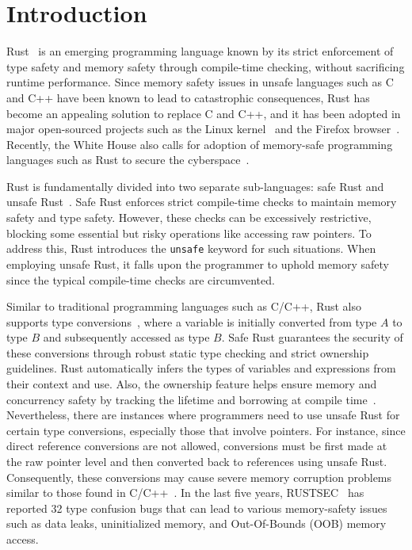\section{Introduction}

Rust~\cite{RustLang} is an emerging programming language known by its strict enforcement of type safety and memory safety through compile-time checking, without sacrificing runtime performance. Since memory safety issues in unsafe languages such as C and C++ have been known to lead to catastrophic consequences, Rust has become an appealing solution to replace C and C++, and it has been adopted in major open-sourced projects such as the Linux kernel~\cite{LinuxKernel} and the Firefox browser~\cite{MozillaFirefox}. Recently, the White House also calls for adoption of memory-safe programming languages such as Rust to secure the cyberspace~\cite{whitehouse}.

Rust is fundamentally divided into two separate sub-languages: safe Rust and unsafe Rust~\cite{safeunsafe}. Safe Rust enforces strict compile-time checks to maintain memory safety and type safety. However, these checks can be excessively restrictive, blocking some essential but risky operations like accessing raw pointers. To address this, Rust introduces the {\tt unsafe} keyword for such situations. When employing unsafe Rust, it falls upon the programmer to uphold memory safety since the typical compile-time checks are circumvented.

Similar to traditional programming languages such as C/C++, Rust also supports type conversions~\cite{TypeConv22online}, where a variable is initially converted from type $A$ to type $B$  and subsequently accessed as type $B$. Safe Rust guarantees the security of these conversions through robust static type checking and strict ownership guidelines. Rust automatically infers the types of variables and expressions from their context and use. Also, the ownership feature helps ensure memory and concurrency safety by tracking the lifetime and borrowing at compile time~\cite{Ownership}. Nevertheless, there are instances where programmers need to use unsafe Rust for certain type conversions, especially those that involve pointers. For instance, since direct reference conversions are not allowed, conversions must be first made at the raw pointer level and then converted back to references using unsafe Rust. Consequently, these conversions may cause severe memory corruption problems similar to those found in C/C++~\cite{cve-2023-3079, cve-2023-4762, cve-2024-1939}. In the last five years, RUSTSEC~\cite{rustsec} has reported 32 type confusion bugs that can lead to various memory-safety issues such as data leaks, uninitialized memory, and Out-Of-Bounds (OOB) memory access.



